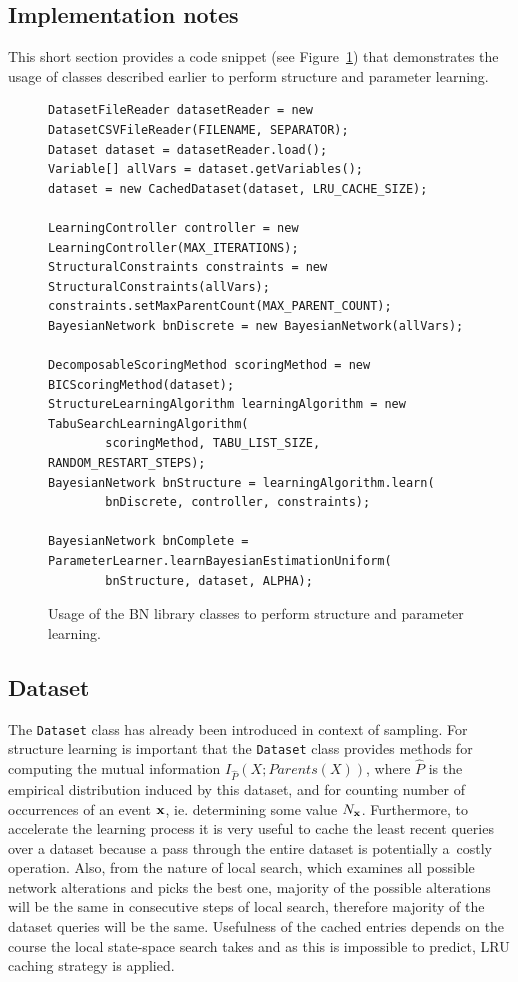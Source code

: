 \documentclass[english,cover]{fitthesis} %
\newcommand{\srccode}[1]{{\tt #1}}         %
\newcommand{\vars}[1]{{\bold{#1}}}         %
\begin{document}
\subsection{Implementation notes}
This short section provides a code snippet (see Figure~\ref{fig:snippet-learning}) that demonstrates the usage of classes described earlier to perform structure and parameter learning.

\begin{figure}[ht]
\centering
{\small
\begin{verbatim}
DatasetFileReader datasetReader = new DatasetCSVFileReader(FILENAME, SEPARATOR);
Dataset dataset = datasetReader.load();
Variable[] allVars = dataset.getVariables();
dataset = new CachedDataset(dataset, LRU_CACHE_SIZE);

LearningController controller = new LearningController(MAX_ITERATIONS);
StructuralConstraints constraints = new StructuralConstraints(allVars);
constraints.setMaxParentCount(MAX_PARENT_COUNT);
BayesianNetwork bnDiscrete = new BayesianNetwork(allVars);

DecomposableScoringMethod scoringMethod = new BICScoringMethod(dataset);
StructureLearningAlgorithm learningAlgorithm = new TabuSearchLearningAlgorithm(
        scoringMethod, TABU_LIST_SIZE, RANDOM_RESTART_STEPS);
BayesianNetwork bnStructure = learningAlgorithm.learn(
        bnDiscrete, controller, constraints);

BayesianNetwork bnComplete = ParameterLearner.learnBayesianEstimationUniform(
        bnStructure, dataset, ALPHA);
\end{verbatim}
}
\caption{Usage of the BN library classes to perform structure and parameter learning.}
\label{fig:snippet-learning}
\end{figure}



\subsection{Dataset}
The \srccode{Dataset} class has already been introduced in context of sampling. For structure learning is important that the \srccode{Dataset} class provides methods for computing the mutual information $I_{\hat P}(X; Parents(X))$, where $\hat P$ is the empirical distribution induced by this dataset, and for counting number of occurrences of an event $\vars{x}$, ie. determining some value $N_\vars{x}$. Furthermore, to accelerate the learning process it is very useful to cache the least recent queries over a dataset because a pass through the entire dataset is potentially a~costly operation. Also, from the nature of local search, which examines all possible network alterations and picks the best one, majority of the possible alterations will be the same in consecutive steps of local search, therefore majority of the dataset queries will be the same. Usefulness of the cached entries depends on the course the local state-space search takes and as this is impossible to predict, LRU caching strategy is applied.
\end{document}
